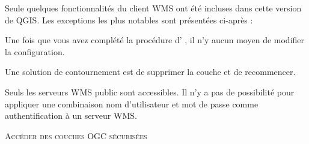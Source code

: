 Seule quelques fonctionnalit\'es du client WMS ont \'et\'e incluses dans cette
version de QGIS. Les exceptions les plus notables sont pr\'esent\'ees ci-apr\`es :


Une fois que vous avez compl\'et\'e la proc\'edure d'
, il n'y aucun moyen
de modifier la configuration.

Une solution de contournement est de supprimer la couche et de recommencer.


Seuls les serveurs WMS public sont accessibles.
Il n'y a pas de possibilit\'e pour appliquer une combinaison nom d'utilisateur
et mot de passe comme authentification \`a un serveur WMS.

\begin{Astuce}[ht]\caption{\textsc{Acc\'eder des couches OGC s\'ecuris\'ees}}
\end{Astuce}


